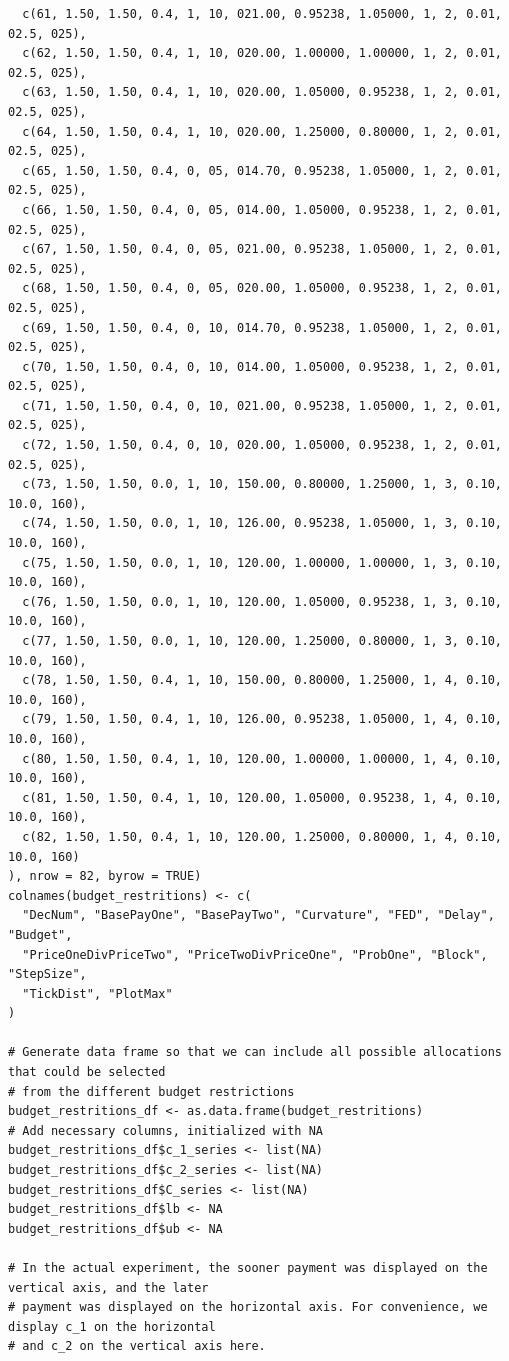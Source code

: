 \begin{lstlisting}
  c(61, 1.50, 1.50, 0.4, 1, 10, 021.00, 0.95238, 1.05000, 1, 2, 0.01, 02.5, 025),
  c(62, 1.50, 1.50, 0.4, 1, 10, 020.00, 1.00000, 1.00000, 1, 2, 0.01, 02.5, 025),
  c(63, 1.50, 1.50, 0.4, 1, 10, 020.00, 1.05000, 0.95238, 1, 2, 0.01, 02.5, 025),
  c(64, 1.50, 1.50, 0.4, 1, 10, 020.00, 1.25000, 0.80000, 1, 2, 0.01, 02.5, 025),
  c(65, 1.50, 1.50, 0.4, 0, 05, 014.70, 0.95238, 1.05000, 1, 2, 0.01, 02.5, 025),
  c(66, 1.50, 1.50, 0.4, 0, 05, 014.00, 1.05000, 0.95238, 1, 2, 0.01, 02.5, 025),
  c(67, 1.50, 1.50, 0.4, 0, 05, 021.00, 0.95238, 1.05000, 1, 2, 0.01, 02.5, 025),
  c(68, 1.50, 1.50, 0.4, 0, 05, 020.00, 1.05000, 0.95238, 1, 2, 0.01, 02.5, 025),
  c(69, 1.50, 1.50, 0.4, 0, 10, 014.70, 0.95238, 1.05000, 1, 2, 0.01, 02.5, 025),
  c(70, 1.50, 1.50, 0.4, 0, 10, 014.00, 1.05000, 0.95238, 1, 2, 0.01, 02.5, 025),
  c(71, 1.50, 1.50, 0.4, 0, 10, 021.00, 0.95238, 1.05000, 1, 2, 0.01, 02.5, 025),
  c(72, 1.50, 1.50, 0.4, 0, 10, 020.00, 1.05000, 0.95238, 1, 2, 0.01, 02.5, 025),
  c(73, 1.50, 1.50, 0.0, 1, 10, 150.00, 0.80000, 1.25000, 1, 3, 0.10, 10.0, 160),
  c(74, 1.50, 1.50, 0.0, 1, 10, 126.00, 0.95238, 1.05000, 1, 3, 0.10, 10.0, 160),
  c(75, 1.50, 1.50, 0.0, 1, 10, 120.00, 1.00000, 1.00000, 1, 3, 0.10, 10.0, 160),
  c(76, 1.50, 1.50, 0.0, 1, 10, 120.00, 1.05000, 0.95238, 1, 3, 0.10, 10.0, 160),
  c(77, 1.50, 1.50, 0.0, 1, 10, 120.00, 1.25000, 0.80000, 1, 3, 0.10, 10.0, 160),
  c(78, 1.50, 1.50, 0.4, 1, 10, 150.00, 0.80000, 1.25000, 1, 4, 0.10, 10.0, 160),
  c(79, 1.50, 1.50, 0.4, 1, 10, 126.00, 0.95238, 1.05000, 1, 4, 0.10, 10.0, 160),
  c(80, 1.50, 1.50, 0.4, 1, 10, 120.00, 1.00000, 1.00000, 1, 4, 0.10, 10.0, 160),
  c(81, 1.50, 1.50, 0.4, 1, 10, 120.00, 1.05000, 0.95238, 1, 4, 0.10, 10.0, 160),
  c(82, 1.50, 1.50, 0.4, 1, 10, 120.00, 1.25000, 0.80000, 1, 4, 0.10, 10.0, 160)
), nrow = 82, byrow = TRUE)
colnames(budget_restritions) <- c(
  "DecNum", "BasePayOne", "BasePayTwo", "Curvature", "FED", "Delay", "Budget",
  "PriceOneDivPriceTwo", "PriceTwoDivPriceOne", "ProbOne", "Block", "StepSize",
  "TickDist", "PlotMax"
)

# Generate data frame so that we can include all possible allocations that could be selected
# from the different budget restrictions
budget_restritions_df <- as.data.frame(budget_restritions)
# Add necessary columns, initialized with NA
budget_restritions_df$c_1_series <- list(NA)
budget_restritions_df$c_2_series <- list(NA)
budget_restritions_df$C_series <- list(NA)
budget_restritions_df$lb <- NA
budget_restritions_df$ub <- NA

# In the actual experiment, the sooner payment was displayed on the vertical axis, and the later
# payment was displayed on the horizontal axis. For convenience, we display c_1 on the horizontal
# and c_2 on the vertical axis here.


\end{lstlisting}
